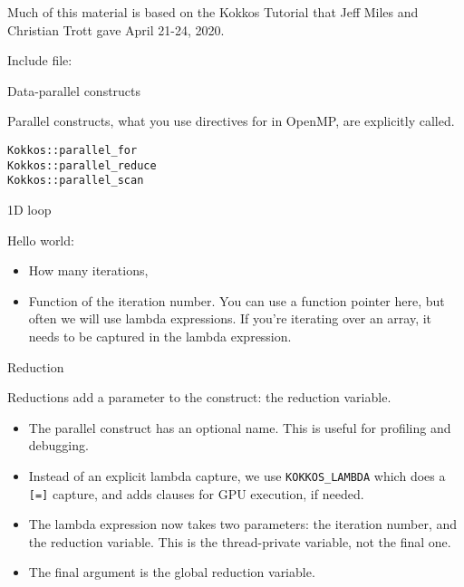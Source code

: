 
Much of this material is based on the 
Kokkos Tutorial
that 
Jeff Miles and Christian Trott
gave
April 21-24, 2020.

Include file:

 {Data-parallel constructs}

Parallel constructs,
what you use directives for in OpenMP,
are explicitly called.
\begin{lstlisting}
Kokkos::parallel_for
Kokkos::parallel_reduce
Kokkos::parallel_scan
\end{lstlisting}

 {1D loop}

Hello world:

\begin{itemize}
\item How many iterations,
\item Function of the iteration number.
  You can use a function pointer here, but often we will use lambda expressions.
  If you're iterating over an array, it needs to be captured in the lambda expression.
\end{itemize}

 {Reduction}

Reductions add a parameter to the construct: the reduction variable.

\begin{itemize}
\item The parallel construct has an optional name.
  This is useful for profiling and debugging.
\item Instead of an explicit lambda capture, we use
  \lstinline+KOKKOS_LAMBDA+ which does a \lstinline+[=]+ capture,
  and adds clauses for \ac{GPU} execution, if needed.
\item The lambda expression now takes two parameters: the iteration number,
  and the reduction variable. This is the thread-private variable, not the final one.
\item The final argument is the global reduction variable.
\end{itemize}

